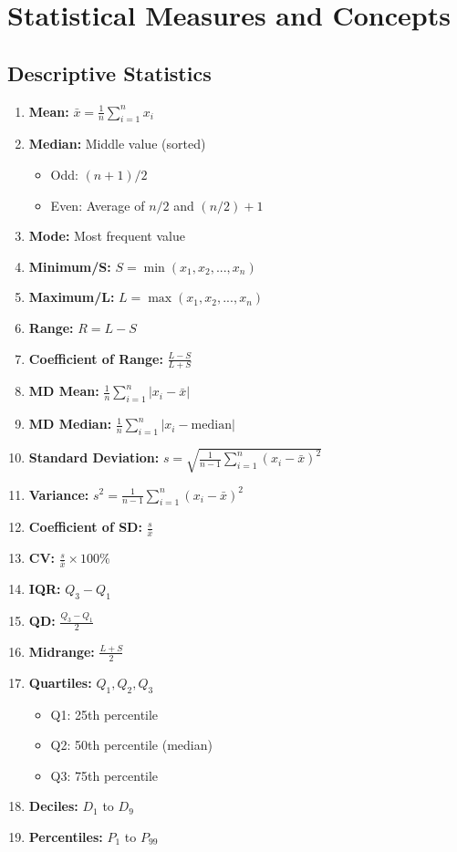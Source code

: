 \documentclass{article}
\begin{document}
\section*{Statistical Measures and Concepts}

\subsection*{Descriptive Statistics}
\begin{enumerate}
    \item \textbf{Mean:} $\bar{x} = \frac{1}{n} \sum_{i=1}^{n} x_i$
    \item \textbf{Median:} Middle value (sorted)
      \begin{itemize}
       \item Odd: $(n+1)/2$
       \item Even: Average of $n/2$ and $(n/2)+1$
      \end{itemize}
    \item \textbf{Mode:} Most frequent value
    \item \textbf{Minimum/S:} $S = \min(x_1, x_2, ..., x_n)$
    \item \textbf{Maximum/L:} $L = \max(x_1, x_2, ..., x_n)$
    \item \textbf{Range:} $R = L - S$
    \item \textbf{Coefficient of Range:} $\frac{L - S}{L + S}$
    \item \textbf{MD Mean:} $\frac{1}{n} \sum_{i=1}^{n} |x_i - \bar{x}|$
    \item \textbf{MD Median:} $\frac{1}{n} \sum_{i=1}^{n} |x_i - \text{median}|$
    \item \textbf{Standard Deviation:} $s = \sqrt{\frac{1}{n-1} \sum_{i=1}^{n} (x_i - \bar{x})^2}$
   \item \textbf{Variance:} $s^2 = \frac{1}{n-1} \sum_{i=1}^{n} (x_i - \bar{x})^2$
    \item \textbf{Coefficient of SD:} $\frac{s}{\bar{x}}$
   \item \textbf{CV:} $\frac{s}{\bar{x}} \times 100\%$
    \item \textbf{IQR:} $Q_3 - Q_1$
    \item \textbf{QD:} $\frac{Q_3 - Q_1}{2}$
    \item \textbf{Midrange:} $\frac{L + S}{2}$
      \item \textbf{Quartiles:} $Q_1, Q_2, Q_3$
      \begin{itemize}
         \item  Q1: 25th percentile
         \item Q2: 50th percentile (median)
         \item Q3: 75th percentile
       \end{itemize}
     \item \textbf{Deciles:} $D_1$ to $D_9$
    \item \textbf{Percentiles:} $P_1$ to $P_{99}$
\end{enumerate}
\end{document}
